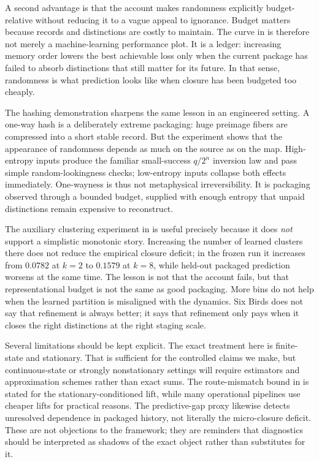 \documentclass[11pt]{article}
\numberwithin{equation}{section}
\begin{document}
A second advantage is that the account makes randomness explicitly budget-relative without reducing it to a vague appeal to ignorance. Budget matters because records and distinctions are costly to maintain. The curve in  is therefore not merely a machine-learning performance plot. It is a ledger: increasing memory order lowers the best achievable loss only when the current package has failed to absorb distinctions that still matter for its future. In that sense, randomness is what prediction looks like when closure has been budgeted too cheaply.

The hashing demonstration sharpens the same lesson in an engineered setting. A one-way hash is a deliberately extreme packaging: huge preimage fibers are compressed into a short stable record. But the experiment shows that the appearance of randomness depends as much on the source as on the map. High-entropy inputs produce the familiar small-success $q/2^n$ inversion law and pass simple random-lookingness checks; low-entropy inputs collapse both effects immediately. One-wayness is thus not metaphysical irreversibility. It is packaging observed through a bounded budget, supplied with enough entropy that unpaid distinctions remain expensive to reconstruct.

The auxiliary clustering experiment in  is useful precisely because it does \emph{not} support a simplistic monotonic story. Increasing the number of learned clusters there does not reduce the empirical closure deficit; in the frozen run it increases from $0.0782$ at $k=2$ to $0.1579$ at $k=8$, while held-out packaged prediction worsens at the same time. The lesson is not that the account fails, but that representational budget is not the same as good packaging. More bins do not help when the learned partition is misaligned with the dynamics. Six Birds does not say that refinement is always better; it says that refinement only pays when it closes the right distinctions at the right staging scale.

Several limitations should be kept explicit. The exact treatment here is finite-state and stationary. That is sufficient for the controlled claims we make, but continuous-state or strongly nonstationary settings will require estimators and approximation schemes rather than exact sums. The route-mismatch bound in  is stated for the stationary-conditioned lift, while many operational pipelines use cheaper lifts for practical reasons. The predictive-gap proxy likewise detects unresolved dependence in packaged history, not literally the micro-closure deficit. These are not objections to the framework; they are reminders that diagnostics should be interpreted as shadows of the exact object rather than substitutes for it.
\end{document}
